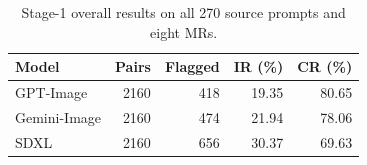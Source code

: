 \begin{table}[t]
\centering
\caption{Stage-1 overall results on all 270 source prompts and eight MRs.}
\label{tab:stage1-overall}
\begin{tabular}{lrrrr}
\toprule
Model & Pairs & Flagged & IR (\%) & CR (\%) \\
\midrule
GPT-Image & 2160 & 418 & 19.35 & 80.65 \\
Gemini-Image & 2160 & 474 & 21.94 & 78.06 \\
SDXL & 2160 & 656 & 30.37 & 69.63 \\
\bottomrule
\end{tabular}
\end{table}
